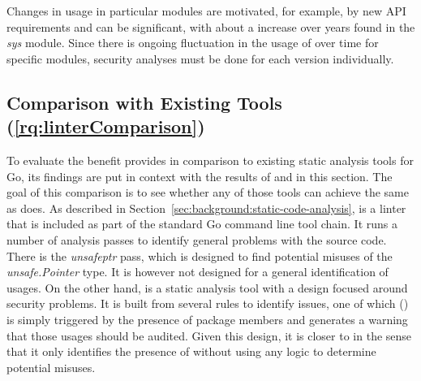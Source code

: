 \begin{answerToRQ}[\ref{rq:changeTime}]
    Changes in \unsafe{} usage in particular modules are motivated, for example, by new \acrshort{API} requirements and
    can be significant, with about a \sysModuleUnsafeIncreaseRounded{} increase over  years found in the
    \textit{sys} module.
    Since there is ongoing fluctuation in the usage of \unsafe{} over time for specific modules, security analyses must
    be done for each version individually.
\end{answerToRQ}



\subsection{Comparison with Existing Tools (\ref{rq:linterComparison})}\label{subsec:go-geiger:evaluation:linters-comparison}

To evaluate the benefit \toolGeiger{} provides in comparison to existing static analysis tools for Go, its findings are
put in context with the results of \toolVet{} and \toolGosec{} in this section.
The goal of this comparison is to see whether any of those tools can achieve the same as \toolGeiger{} does.
As described in Section~\ref{sec:background:static-code-analysis}, \toolVet{} is a linter that is included as part of
the standard Go command line tool chain.
It runs a number of analysis passes to identify general problems with the source code.
There is the \textit{unsafeptr} pass, which is designed to find potential misuses of the \textit{unsafe.Pointer} type.
It is however not designed for a general identification of \unsafe{} usages.
On the other hand, \toolGosec{} is a static analysis tool with a design focused around security problems.
It is built from several rules to identify issues, one of which (\textit{}) is simply triggered by the
presence of \unsafe{} package members and generates a warning that those usages should be audited.
Given this design, it is closer to \toolGeiger{} in the sense that it only identifies the presence of \unsafe{} without
using any logic to determine potential misuses.

